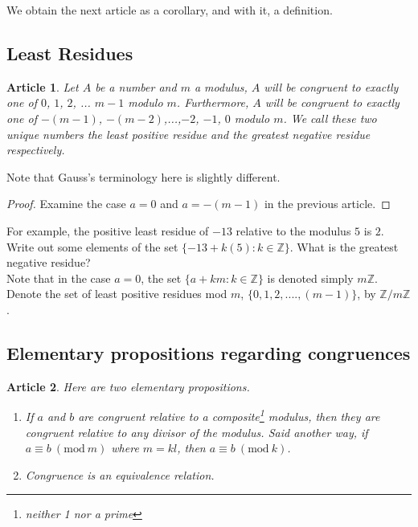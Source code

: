 \documentclass{article}
\theoremstyle{problemstyle}
\newtheorem{article}{Article}
\newcommand{\Mod}[1]{\ (\mathrm{mod}\ #1)}
\begin{document}
We obtain the next article as a corollary, and with it, a definition. 

\subsection{Least Residues}

\begin{article}
Let $A$ be a number and $m$ a modulus, $A$ will be congruent to exactly one of $0$, $1$, $2$, ... $m-1$ modulo $m$. Furthermore, $A$ will be congruent to exactly one of $-(m-1)$, $-(m-2)$,...,$-2$, $-1$, $0$ modulo $m$. We call these two unique numbers the least positive residue and the greatest negative residue respectively. 
\end{article}

Note that Gauss's terminology here is slightly different.  

\begin{proof}
Examine the case $a = 0$ and $a = -(m-1)$ in the previous article.  
\end{proof}

For example, the positive least residue of $-13$ relative to the modulus $5$ is $2$. Write out some elements of the set $\{-13 + k(5): k \in \mathbb{Z}\}$. What is the greatest negative residue?\\

Note that in the case $a = 0$, the set $\{a + km : k \in \mathbb{Z}\}$ is denoted simply $m\mathbb{Z}$. Denote the set of least positive residues mod $m$, $\{0,1,2,....,(m-1)\}$, by $\mathbb{Z}/m\mathbb{Z}$. 

\subsection{Elementary propositions regarding congruences}

\begin{article}
Here are two elementary propositions. 
\begin{enumerate}
\item If $a$ and $b$ are congruent relative to a composite\footnote{neither 1 nor a prime} modulus, then they are congruent relative to any divisor of the modulus. Said another way, if $a \equiv b \Mod{m}$ where $m = kl$, then $a \equiv b \Mod{k}$. 
\item Congruence is an equivalence relation.
\end{enumerate}
\end{article}
\end{document}
